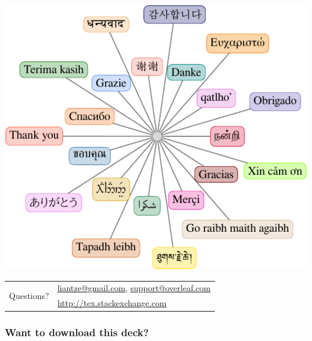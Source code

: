 \documentclass[xcolor={x11names,svgnames,dvipsnames},trans]{beamer}
\begin{document}
\begin{frame}
\centering
\includegraphics[width=.6\textwidth]{multiling-TQ}

\bigskip 
\begin{tabular}{cl}
\multirow{2}{*}{\huge Questions?} & \url{liantze@gmail.com}, \url{support@overleaf.com}\\
& \url{http://tex.stackexchange.com}\\
\end{tabular}

\end{frame}

\begin{frame}
\frametitle{Want to download this deck?}
\centering
{}
\end{frame}
\end{document}
